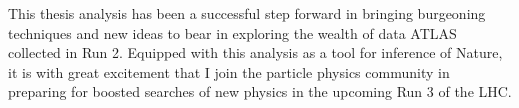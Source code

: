 This thesis analysis has been a successful step forward in bringing burgeoning techniques and new ideas to bear in exploring the wealth of data ATLAS collected in Run 2.
Equipped with this analysis as a tool for inference of Nature, it is with great excitement that I join the particle physics community in preparing for boosted searches of new physics in the upcoming Run 3 of the LHC.
